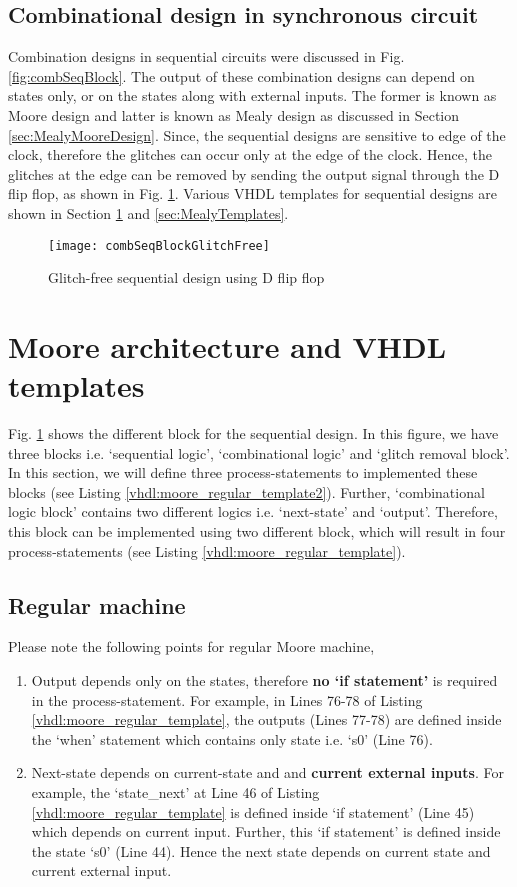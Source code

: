 \subsection{Combinational design in synchronous circuit}\label{sec:glitchInsSync}
Combination designs in sequential circuits were discussed in Fig. \ref{fig:combSeqBlock}. The output of these combination designs can depend on states only, or on the states along with external inputs. The former is known as Moore design and latter is known as Mealy design as discussed in Section \ref{sec:MealyMooreDesign}. Since, the sequential designs are sensitive to edge of the clock, therefore the glitches can occur only at the edge of the clock. Hence, the glitches at the edge can be removed by sending the output signal through the D flip flop, as shown in Fig. \ref{fig:combSeqBlockGlitchFree}. Various VHDL templates for sequential designs are shown in Section \ref{sec:MooreTemplates} and \ref{sec:MealyTemplates}. 

\begin{figure}[!h]
	\centering
	\texttt{[image: combSeqBlockGlitchFree]}
	\caption{Glitch-free sequential design using D flip flop}
	\label{fig:combSeqBlockGlitchFree}
\end{figure}


\section{Moore architecture and VHDL templates} \label{sec:MooreTemplates}
Fig. \ref{fig:combSeqBlockGlitchFree} shows the different block for the sequential design. In this figure, we have three blocks i.e. `sequential logic', `combinational logic' and `glitch removal block'. In this section, we will define three process-statements to implemented these blocks (see Listing \ref{vhdl:moore_regular_template2}). Further, `combinational logic block' contains two different logics i.e. `next-state' and `output'. Therefore, this block can be implemented using two different block, which will result in four process-statements (see Listing \ref{vhdl:moore_regular_template}). 

\subsection{Regular machine}
Please note the following points for regular Moore machine, 
\begin{enumerate}
	\item Output depends only on the states, therefore \textbf{no `if statement'} is required in the process-statement. For example, in Lines 76-78 of Listing \ref{vhdl:moore_regular_template}, the outputs (Lines 77-78) are defined inside the `when' statement which contains only state i.e. `s0' (Line 76). 
	\item Next-state depends on current-state and and  \textbf{current external inputs}. For example, the `state\_next' at Line 46 of Listing \ref{vhdl:moore_regular_template} is defined inside `if statement' (Line 45) which depends on current input. Further, this `if statement' is defined inside the state `s0' (Line 44). Hence the next state depends on current state and current external input.    
\end{enumerate}

